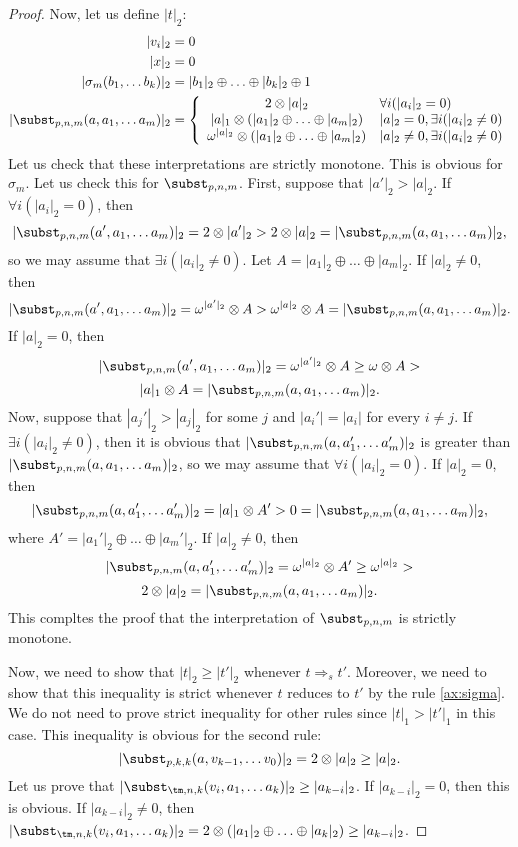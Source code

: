 \begin{proof}
Now, let us define $|t|_2$:
\begin{align*}
|v_i|_2 & = 0 \\
|x|_2 & = 0 \\
|\sigma_m(b_1, \ldots b_k)|_2 & = |b_1|_2 \oplus \ldots \oplus |b_k|_2 \oplus 1 \\
|\subst_{p,n,m}(a, a_1, \ldots a_m)|_2 & = 
\left\{
\begin{array}{c l}	
     2 \otimes |a|_2 & \forall i (|a_i|_2 = 0) \\
     |a|_1 \otimes (|a_1|_2 \oplus \ldots \oplus |a_m|_2) & |a|_2 = 0, \exists i (|a_i|_2 \neq 0) \\
     \omega^{|a|_2} \otimes (|a_1|_2 \oplus \ldots \oplus |a_m|_2) & |a|_2 \neq 0, \exists i (|a_i|_2 \neq 0)
\end{array}\right.
\end{align*}
Let us check that these interpretations are strictly monotone.
This is obvious for $\sigma_m$.
Let us check this for $\subst_{p,n,m}$.
First, suppose that $|a'|_2 > |a|_2$.
If $\forall i (|a_i|_2 = 0)$, then
\[ |\subst_{p,n,m}(a', a_1, \ldots a_m)|_2 = 2 \otimes |a'|_2 > 2 \otimes |a|_2 = |\subst_{p,n,m}(a, a_1, \ldots a_m)|_2, \]
so we may assume that $\exists i (|a_i|_2 \neq 0)$.
Let $A = |a_1|_2 \oplus \ldots \oplus |a_m|_2$.
If $|a|_2 \neq 0$, then
\[ |\subst_{p,n,m}(a', a_1, \ldots a_m)|_2 = \omega^{|a'|_2} \otimes A > \omega^{|a|_2} \otimes A = |\subst_{p,n,m}(a, a_1, \ldots a_m)|_2. \]
If $|a|_2 = 0$, then
\[ |\subst_{p,n,m}(a', a_1, \ldots a_m)|_2 = \omega^{|a'|_2} \otimes A \geq \omega \otimes A > \]
\[ |a|_1 \otimes A = |\subst_{p,n,m}(a, a_1, \ldots a_m)|_2. \]
Now, suppose that $|a_j'|_2 > |a_j|_2$ for some $j$ and $|a_i'| = |a_i|$ for every $i \neq j$.
If $\exists i (|a_i|_2 \neq 0)$, then it is obvious that $|\subst_{p,n,m}(a, a_1', \ldots a_m')|_2$ is greater than $|\subst_{p,n,m}(a, a_1, \ldots a_m)|_2$,
so we may assume that $\forall i (|a_i|_2 = 0)$.
If $|a|_2 = 0$, then
\[ |\subst_{p,n,m}(a, a_1', \ldots a_m')|_2 = |a|_1 \otimes A' > 0 = |\subst_{p,n,m}(a, a_1, \ldots a_m)|_2, \]
where $A' = |a_1'|_2 \oplus \ldots \oplus |a_m'|_2$.
If $|a|_2 \neq 0$, then
\[ |\subst_{p,n,m}(a, a_1', \ldots a_m')|_2 = \omega^{|a|_2} \otimes A' \geq \omega^{|a|_2} > \]
\[ 2 \otimes |a|_2 = |\subst_{p,n,m}(a, a_1, \ldots a_m)|_2. \]
This compltes the proof that the interpretation of $\subst_{p,n,m}$ is strictly monotone.

Now, we need to show that $|t|_2 \geq |t'|_2$ whenever $t \Rightarrow_s t'$.
Moreover, we need to show that this inequality is strict whenever $t$ reduces to $t'$ by the rule \eqref{ax:sigma}.
We do not need to prove strict inequality for other rules since $|t|_1 > |t'|_1$ in this case.
This inequality is obvious for the second rule:
\[ |\subst_{p,k,k}(a, v_{k-1}, \ldots v_0)|_2 = 2 \otimes |a|_2 \geq |a|_2. \]
Let us prove that $|\subst_{\tm,n,k}(v_i, a_1, \ldots a_k)|_2 \geq |a_{k-i}|_2$.
If $|a_{k-i}|_2 = 0$, then this is obvious.
If $|a_{k-i}|_2 \neq 0$, then $|\subst_{\tm,n,k}(v_i, a_1, \ldots a_k)|_2 = 2 \otimes (|a_1|_2 \oplus \ldots \oplus |a_k|_2) \geq |a_{k-i}|_2$.


\end{proof}
